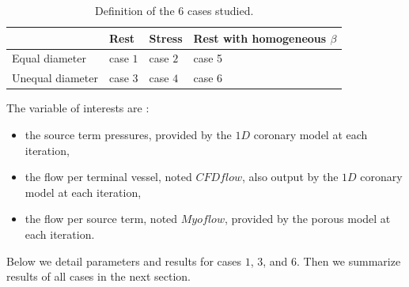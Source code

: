 \documentclass[a4paper, 11pt]{article} %
\begin{document}
\begin{table}[hbtp]
\begin{tabular}{|p{3.5cm}|p{2.5cm}|p{2.5cm}|p{3.5cm}|}
\hline
 & Rest & Stress & Rest with homogeneous $\beta$\\
 \hline
 Equal diameter & case $1$ & case $2$ & case 5\\
 Unequal diameter & case $3$ & case $4$ & case 6\\
 \hline
\end{tabular}
\caption{Definition of the $6$ cases studied.}
\label{tab:defcase}
\end{table}
 
The variable of interests are :
\begin{itemize}
\item the source term pressures, provided by the $1D$ coronary model at each iteration,
\item the flow per terminal vessel, noted $CFD flow$, also output by the $1D$ coronary model at each iteration,
\item the flow per source term, noted $Myo flow$, provided by the porous model at each iteration. 
\end{itemize}

Below we detail parameters and results for cases $1$, $3$, and $6$. Then we summarize results of all cases in the next section.
\end{document}
